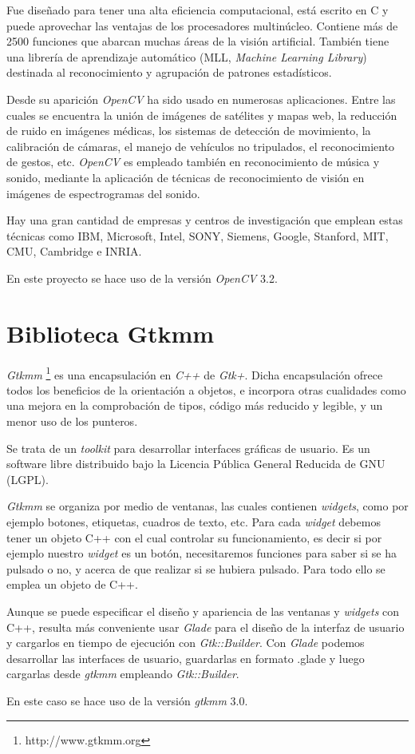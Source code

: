 Fue diseñado para tener una alta eficiencia computacional, está escrito en C y puede aprovechar las ventajas de los procesadores multinúcleo. Contiene más  de  2500  funciones  que  abarcan  muchas  áreas  de  la  visión  artificial.  También  tiene  una librería   de   aprendizaje   automático   (MLL,  \textit{Machine   Learning   Library})   destinada   al reconocimiento  y agrupación de patrones estadísticos.

Desde su aparición \textit{OpenCV} ha sido usado en numerosas aplicaciones. Entre las cuales se encuentra la unión de imágenes de satélites y mapas web, la reducción de ruido en imágenes  médicas,  los  sistemas  de  detección  de movimiento,  la  calibración  de  cámaras,  el manejo  de  vehículos  no  tripulados, el  reconocimiento  de  gestos, etc. \textit{OpenCV} es empleado también en reconocimiento de música y sonido, mediante la aplicación de técnicas de reconocimiento de visión en imágenes de espectrogramas del sonido.

Hay  una  gran  cantidad  de  empresas    y  centros  de  investigación  que  emplean  estas técnicas como IBM, Microsoft, Intel, SONY, Siemens, Google, Stanford, MIT, CMU, Cambridge e INRIA.

En este proyecto se hace uso de la versión \textit{OpenCV} 3.2.


\section{Biblioteca Gtkmm}

\textit{Gtkmm} \footnote{http://www.gtkmm.org} es una encapsulación en \textit{C++} de \textit{Gtk+}. Dicha encapsulación ofrece todos los beneficios de la orientación a objetos, e incorpora otras cualidades como una mejora en la comprobación de tipos, código más reducido y legible, y un menor uso de los punteros. 

Se trata de un \textit{toolkit} para desarrollar interfaces gráficas de usuario. Es un software libre distribuido bajo la Licencia Pública General Reducida de GNU (LGPL).

\textit{Gtkmm} se organiza por medio de ventanas, las cuales contienen \textit{widgets}, como por ejemplo botones, etiquetas, cuadros de texto, etc.  Para cada \textit{widget} debemos tener un objeto C++ con el cual controlar su funcionamiento, es decir si por ejemplo nuestro \textit{widget} es un botón, necesitaremos funciones para saber si se ha pulsado o no, y acerca de que realizar si se hubiera pulsado. Para todo ello se emplea un objeto de C++. 

Aunque se puede especificar el diseño y apariencia de las ventanas y \textit{widgets} con C++, resulta más conveniente usar \textit{Glade} para el diseño de la interfaz de usuario y cargarlos en tiempo de ejecución con \textit{Gtk::Builder}. Con  \textit{Glade} podemos desarrollar las interfaces de usuario, guardarlas en formato .glade y luego cargarlas desde \textit{gtkmm} empleando \textit{ Gtk::Builder}.

En este caso se hace uso de la versión \textit{gtkmm} 3.0.



